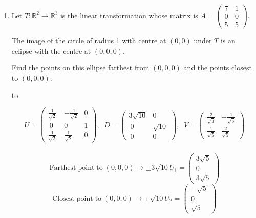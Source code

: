 \documentclass[a4paper,11pt]{article}
\newcommand{\hdotrule}[1]{\hbox to \textwidth{\leaders\hbox to #1pt{\hss . \hss}\hfil}}
\begin{document}
\begin{preview}
\begin{enumerate}
    \hrule

		\setcounter{enumi}{4}
		\item Let $T : \mathbb{R}^2 \rightarrow \mathbb{R}^3$ is the linear transformation whose matrix is $A = \begin{pmatrix}
			  7 &\, 1 \\ 0 &\, 0 \\ 5 &\, 5 
		\end{pmatrix}$. 
		
		The image of the circle of radius 1 with centre at $(0,0)$ under $T$ is an eclipse with the centre at $(0,0,0)$. 
		
		Find the points on this ellipse farthest from $(0,0,0)$ and the points closest to $(0,0,0)$.

		\hdotrule{5}

    $$ U = \begin{pmatrix}\frac{1}{\sqrt{2}}&-\frac{1}{\sqrt{2}}&0\\ \:0&0&1\\ \frac{1}{\sqrt{2}}\:&\frac{1}{\sqrt{2}}&0\end{pmatrix}, \;\; D = \begin{pmatrix}3\sqrt{10}&0\\ \:0&\sqrt{10}\\ \:0&0\end{pmatrix}, \;\; V = \begin{pmatrix}\frac{2}{\sqrt{5}}&-\frac{1}{\sqrt{5}}\\ \frac{1}{\sqrt{5}}&\frac{2}{\sqrt{5}}\end{pmatrix} $$\\
    
    $$ \mathrm{Farthest \; point \; to \; (0,0,0)} \rightarrow \pm 3\sqrt{10}U_1 = \begin{pmatrix}3\sqrt{5}\\ 0\\ 3\sqrt{5}\end{pmatrix}$$
    $$ \mathrm{Closest \; point \; to \; (0,0,0)} \rightarrow \pm \sqrt{10}U_2 = \begin{pmatrix}-\sqrt{5}\\ 0\\ \sqrt{5}\end{pmatrix}$$

	\end{enumerate}


\end{preview}
\end{document}
